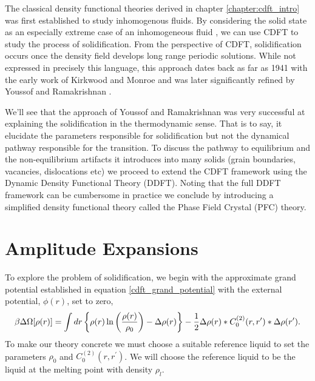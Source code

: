 \label{chapter:cdft_of_freezing}

The classical density functional theories derived in chapter
\ref{chapter:cdft_intro} was first established to study inhomogenous fluids.
By considering the solid state as an especially extreme case of an
inhomogeneous fluid \cite{HANSEN-CH6}, we can use CDFT to study the process of
solidification. From the perspective of CDFT, solidification occurs once the
density field develops long range periodic solutions.  While not expressed in
precisely this language, this approach dates back as far as 1941 with the early
work of Kirkwood and Monroe \cite{KIRKWOOD_MONROE41} and was later
significantly refined by Youssof and Ramakrishnan \cite{RAMAKRISHNAN79}.

We'll see that the approach of Youssof and Ramakrishnan was very successful at
explaining the solidification in the thermodynamic sense. That is to say, it
elucidate the parameters responsible for solidification but not the dynamical
pathway responsible for the transition. To discuss the pathway to equilibrium
and the non-equilibrium artifacts it introduces into many solids (grain
boundaries, vacancies, dislocations etc) we proceed to extend the CDFT
framework using the Dynamic Density Functional Theory (DDFT). Noting that the
full DDFT framework can be cumbersome in practice we conclude by introducing a
simplified density functional theory called the Phase Field Crystal (PFC)
theory.

\section{Amplitude Expansions} %

To explore the problem of solidification, we begin with the approximate grand
potential established in equation \ref{cdft_grand_potential} with the external
potential, $\phi(r)$, set to zero,
%
\begin{equation}
    \beta \Delta \Omega[\rho(r)] =
        \int dr \left\lbrace 
            \rho(r)\ln\left(\frac{\rho(r)}{\rho_0}\right) - \Delta\rho(r)\right\rbrace
        - \frac{1}{2} \Delta\rho(r) \ast C^{(2)}_0(r, r^\prime)
            \ast \Delta\rho(r^\prime).
\end{equation}
%
To make our theory concrete we must choose a suitable reference liquid to set
the parameters $\rho_0$ and $C^{(2)}_0(r, r^\prime)$. We will choose the
reference liquid to be the liquid at the melting point with density $\rho_l$.

